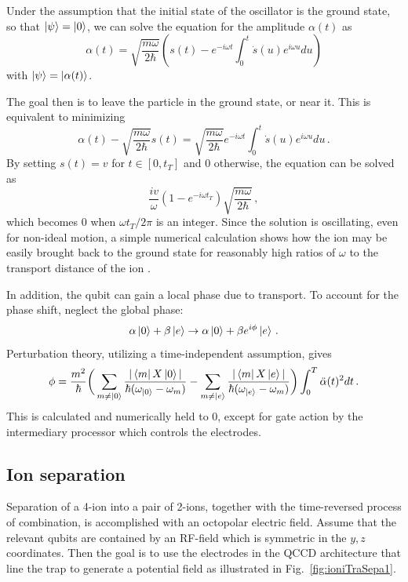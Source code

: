 \documentclass[12pt,a4paper]{amsart}
\numberwithin{equation}{section}
\theoremstyle{plain}
\theoremstyle{definition}
\begin{document}
Under the assumption that the initial state of the oscillator is the ground state, so that $\ket{\psi}=\ket{0}$, we can solve the equation for the amplitude $\alpha(t)$ as 
$$
\alpha(t) = \sqrt{\frac{m\omega}{2\hbar}}(s(t)-e^{-i\omega t}\int_0^t\dot{s}(u)e^{i\omega u}du)
$$
with $\ket{\psi} = \ket{\alpha(t)}$.


The goal then is to leave the particle in the ground state, or near it. This is equivalent to minimizing 
$$
\alpha(t) - \sqrt{\frac{m\omega}{2\hbar}}s(t) = \sqrt{\frac{m\omega}{2\hbar}}e^{-i\omega t}\int_0^t\dot{s}(u)e^{i\omega u}du\,.
$$
By setting $s(t)=v$ for $t\in [0,t_T]$ and $0$ otherwise, the equation can be solved as 
$$
\frac{iv}{\omega}\left(1-e^{-i\omega t_T}\right)\sqrt{\frac{m\omega}{2\hbar}}\,,
$$
which becomes $0$ when ${\omega t_T}/{2\pi}$ is an integer.
Since the solution is oscillating, even for non-ideal motion, a simple numerical calculation shows how the ion may be easily brought back to the ground state for reasonably high ratios of $\omega$ to the transport distance of the ion \cite{ioniTranFast}.


In addition, the qubit can gain a local phase due to transport. To account for the phase shift, neglect the global phase:
$$
\alpha\ket{0}+\beta\ket{e}\rightarrow \alpha\ket{0}+\beta e^{i\phi}\ket{e}\,.
$$
Perturbation theory, utilizing a time-independent assumption, gives
$$
\phi=\frac{m^2}{\hbar}\bigg(\sum_{m\neq \ket{0}} \frac{|\bra{m}X\ket{0}|}{\hbar (\omega_{\ket{0}} - \omega_{m})} -  
\sum_{m\neq \ket{e}} \frac{|\bra{m}X\ket{e}|}{\hbar (\omega_{\ket{e}} - \omega_{m})}\bigg)\int_0^T \ddot{\alpha}(t)^2 dt \, .
$$
This is calculated and numerically held to $0$, except for gate action by the intermediary processor which controls the electrodes.


\subsection{Ion separation}


Separation of a 4-ion into a pair of 2-ions, together with the time-reversed process of combination, is accomplished with an octopolar electric field. Assume that the relevant qubits are contained by an RF-field which is symmetric in the $y,z$ coordinates. Then the goal is to use the electrodes in the QCCD architecture that line the trap to generate a potential field as illustrated in Fig.~\ref{fig:ioniTraSepa1}.
 
\end{document}
